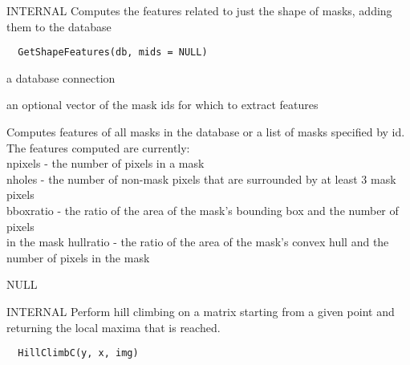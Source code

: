 \documentclass[a4paper]{book}
\begin{document}
%
\begin{Description}\relax
INTERNAL Computes the features related to just the shape
of masks, adding them to the database
\end{Description}
%
\begin{Usage}
\begin{verbatim}
  GetShapeFeatures(db, mids = NULL)
\end{verbatim}
\end{Usage}
%
\begin{Arguments}
\begin{ldescription}
\item[\code{db}] a database connection

\item[\code{mids}] an optional vector of the mask ids for which
to extract features
\end{ldescription}
\end{Arguments}
%
\begin{Details}\relax
Computes features of all masks in the database or a list
of masks specified by id.  The features computed are
currently:\\{} npixels - the number of pixels in a mask
\\{} nholes - the number of non-mask pixels that are
surrounded by at least 3 mask pixels\\{} bboxratio - the
ratio of the area of the mask's bounding box and the
number of pixels\\{} in the mask hullratio - the ratio of
the area of the mask's convex hull and the number of
pixels in the mask\\{}
\end{Details}
%
\begin{Value}
NULL
\end{Value}
%
\begin{Description}\relax
INTERNAL Perform hill climbing on a matrix starting from
a given point and returning the local maxima that is
reached.
\end{Description}
%
\begin{Usage}
\begin{verbatim}
  HillClimbC(y, x, img)
\end{verbatim}
\end{Usage}
\end{document}
